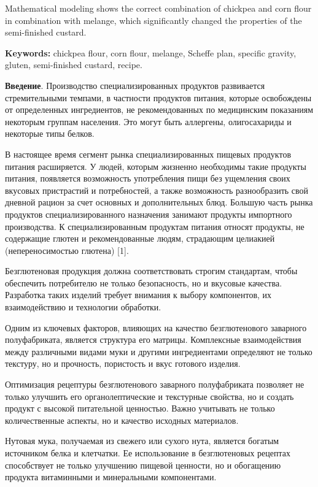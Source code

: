 Mathematical modeling shows the correct combination of chickpea and corn
flour in combination with melange, which significantly changed the
properties of the semi-finished custard.

{\bfseries Keywords:} chickpea flour, corn flour, melange, Scheffe plan,
specific gravity, gluten, semi-finished custard, recipe.

\begin{multicols}{2}
{\bfseries Введение}. Производство специализированных продуктов развивается
стремительными темпами, в частности продуктов питания, которые
освобождены от определенных ингредиентов, не рекомендованных по
медицинским показаниям некоторым группам населения. Это могут быть
аллергены, олигосахариды и некоторые типы белков.

В настоящее время сегмент рынка специализированных пищевых продуктов
питания расширяется. У людей, которым жизненно необходимы такие продукты
питания, появляется возможность употребления пищи без ущемления своих
вкусовых пристрастий и потребностей, а также возможность разнообразить
свой дневной рацион за счет основных и дополнительных блюд. Большую
часть рынка продуктов специализированного назначения занимают продукты
импортного производства. К специализированным продуктам питания относят
продукты, не содержащие глютен и рекомендованные людям, страдающим
целиакией (непереносимостью глютена) {[}1{]}.

Безглютеновая продукция должна соответствовать строгим стандартам, чтобы
обеспечить потребителю не только безопасность, но и вкусовые качества.
Разработка таких изделий требует внимания к выбору компонентов, их
взаимодействию и технологии обработки.

Одним из ключевых факторов, влияющих на качество безглютенового
заварного полуфабриката, является структура его матрицы. Комплексные
взаимодействия между различными видами муки и другими ингредиентами
определяют не только текстуру, но и прочность, пористость и вкус
готового изделия.

Оптимизация рецептуры безглютенового заварного полуфабриката позволяет
не только улучшить его органолептические и текстурные свойства, но и
создать продукт с высокой питательной ценностью. Важно учитывать не
только количественные аспекты, но и качество исходных материалов.

Нутовая мука, получаемая из свежего или сухого нута, является богатым
источником белка и клетчатки. Ее использование в безглютеновых рецептах
способствует не только улучшению пищевой ценности, но и обогащению
продукта витаминными и минеральными компонентами.


\end{multicols}
